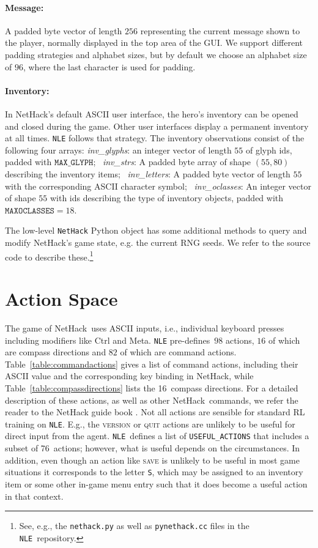 \documentclass{article}
\newcommand{\nethack}{NetHack}
\newcommand{\NLE}{\texttt{NLE}}
\begin{document}
\paragraph{Message:} A padded byte vector of length $256$
representing the current message shown to the player, normally
displayed in the top area of the GUI. We support different padding
strategies and alphabet sizes, but by default we choose an alphabet
size of $96$, where the last character is used for padding.

\paragraph{Inventory:} In NetHack's default ASCII user
interface, the hero's inventory can be opened and closed during the
game. Other user interfaces display a permanent inventory at all
times. \NLE{} follows that strategy. The inventory observations
consist of the following four arrays: \textit{inv\_glyphs}: an integer
vector of length $55$ of glyph ids, padded with
$\texttt{MAX\_GLYPH}$; \ \textit{inv\_strs}: A padded byte array of
shape $(55, 80)$ describing the inventory
items; \ \textit{inv\_letters}: A padded byte vector of length $55$
with the corresponding ASCII character
symbol; \ \textit{inv\_oclasses}: An integer vector of shape $55$ with
ids describing the type of inventory objects, padded with
$\texttt{MAXOCLASSES} = 18$.

The low-level \texttt{NetHack} Python object has some additional
methods to query and modify NetHack's game state, e.g. the current RNG
seeds. We refer to the source code to describe these.\footnote{See,
e.g., the \texttt{nethack.py} as well as \texttt{pynethack.cc} files
in the \NLE\ repository.}

\section{Action Space}
\label{sec:actions}

The game of \nethack\ uses ASCII inputs, i.e., individual keyboard
presses including modifiers like Ctrl and Meta. \NLE{}
pre-defines~$98$ actions, $16$ of which are compass
directions and $82$ of which are command
actions. Table~\ref{table:commandactions} gives a list of command
actions, including their ASCII value and the corresponding key binding
in \nethack{}, while Table~\ref{table:compassdirections} lists the
16~compass directions. For a detailed description of these actions, as
well as other \nethack\ commands, we refer the reader to the NetHack guide book
\citep{raymond2020guide}. Not all actions are sensible for standard RL
training on \NLE. E.g., the \textsc{version} or \textsc{quit} actions
are unlikely to be useful for direct input from the agent. \NLE\
defines a list of \texttt{USEFUL\_ACTIONS} that includes a subset of
76~actions; however, what is useful depends on the circumstances. In
addition, even though an action like \textsc{save} is unlikely to be
useful in most game situations it corresponds to the
letter \texttt{S}, which may be assigned to an inventory item or some
other in-game menu entry such that it does become a useful action in
that context.
\end{document}
